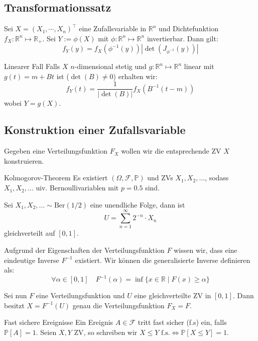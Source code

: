 \documentclass[a4paper,10pt]{article}
\def\R{\mathbb{R}}
\def\P{\mathbb{P}}
\def\F{\mathcal{F}}
\begin{document}
\subsection{Transformationssatz}

\begin{mainbox}{}
	Sei $X = (X_1, \cdots, X_n)^\top$ eine Zufallsvariable in $\R^n$ und Dichtefunktion $f_X: \R^n \mapsto \R_+$. Sei $Y := \phi(X)$ mit $\phi: \R^n \mapsto \R^n$ invertierbar. Dann gilt:
	$$f_Y(y) = f_X(\phi^{-1}(y)) \left| \det \left( J_{\phi^{-1}}(y) \right) \right|$$
\end{mainbox}

\begin{mainbox}{Linearer Fall}
	Falls $X$ $n$-dimensional stetig und $g: \R^n \mapsto \R^n$ linear mit $g(t) = m + Bt$ ist ($\det(B) \neq 0$) erhalten wir:
	$$
		f_Y(t) = \frac{1}{\left| \det \left( B \right) \right|} f_X \left( B^{-1} (t - m) \right)
	$$
	wobei $Y = g(X)$.
\end{mainbox}

\subsection{Konstruktion einer Zufallsvariable}
Gegeben eine Verteilungsfunktion \(F_X\) wollen wir die entsprechende ZV \(X\) konstruieren.
\begin{subbox}{Kolmogorov-Theorem}
	Es existiert \((\Omega, \F,\P)\) und ZVs \( X_1, X_2, \ldots\), sodass \(X_1, X_2, \ldots\) uiv. Bernoullivariablen mit \(p = 0.5\) sind.
\end{subbox}

Sei \(X_1, X_2,\ldots \sim \text{Ber}(1/2)\) eine unendliche Folge, dann ist
\[U = \sum_{n = 1}^\infty 2^{-n}\cdot X_n\]
gleichverteilt auf \([0,1]\).

Aufgrund der Eigenschaften der Verteilungsfunktion \(F\) wissen wir, dass eine eindeutige Inverse $F^{-1}$ existiert. Wir können die generalisierte Inverse definieren als: \[\forall \alpha \in [0,1] \quad F^{-1}(\alpha) = \inf \{x \in \R \mid F(x) \geq \alpha\}\]

Sei nun \(F\) eine Verteilungsfunktion und \(U\) eine gleichverteilte ZV in \([0,1]\). Dann besitzt \(X = F^{-1}(U)\) genau die Verteilungsfunktion \(F_X = F\).

\begin{subbox}{Fast sichere Ereignisse}
	Ein Ereignis \(A \in \F\) tritt fast sicher (f.s) ein, falls \(\P[A] = 1\). Seien \(X, Y\) ZV, so schreiben wir \(X \le Y \text{ f.s.} \iff \P[X\le Y] = 1\).
\end{subbox}
\end{document}
